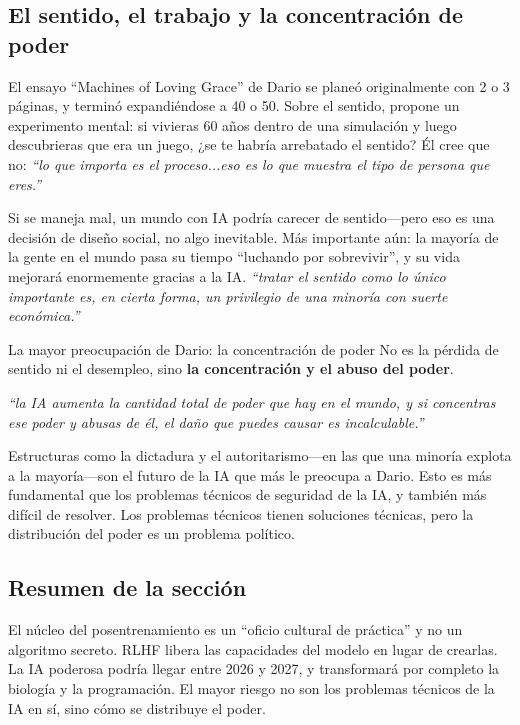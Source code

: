 \documentclass[a4paper]{article}
\begin{document}
\subsection{El sentido, el trabajo y la concentración de poder}

El ensayo ``Machines of Loving Grace'' de Dario se planeó originalmente con 2 o 3 páginas, y terminó expandiéndose a 40 o 50. Sobre el sentido, propone un experimento mental: si vivieras 60 años dentro de una simulación y luego descubrieras que era un juego, ¿se te habría arrebatado el sentido? Él cree que no: \textit{``lo que importa es el proceso...eso es lo que muestra el tipo de persona que eres.''}

Si se maneja mal, un mundo con IA podría carecer de sentido—pero eso es una decisión de diseño social, no algo inevitable. Más importante aún: la mayoría de la gente en el mundo pasa su tiempo ``luchando por sobrevivir'', y su vida mejorará enormemente gracias a la IA. \textit{``tratar el sentido como lo único importante es, en cierta forma, un privilegio de una minoría con suerte económica.''}

\begin{warningbox}{La mayor preocupación de Dario: la concentración de poder}
No es la pérdida de sentido ni el desempleo, sino \textbf{la concentración y el abuso del poder}.

\textit{``la IA aumenta la cantidad total de poder que hay en el mundo, y si concentras ese poder y abusas de él, el daño que puedes causar es incalculable.''}

Estructuras como la dictadura y el autoritarismo—en las que una minoría explota a la mayoría—son el futuro de la IA que más le preocupa a Dario. Esto es más fundamental que los problemas técnicos de seguridad de la IA, y también más difícil de resolver. Los problemas técnicos tienen soluciones técnicas, pero la distribución del poder es un problema político.
\end{warningbox}

\subsection{Resumen de la sección}

El núcleo del posentrenamiento es un ``oficio cultural de práctica'' y no un algoritmo secreto. RLHF libera las capacidades del modelo en lugar de crearlas. La IA poderosa podría llegar entre 2026 y 2027, y transformará por completo la biología y la programación. El mayor riesgo no son los problemas técnicos de la IA en sí, sino cómo se distribuye el poder.
\end{document}
